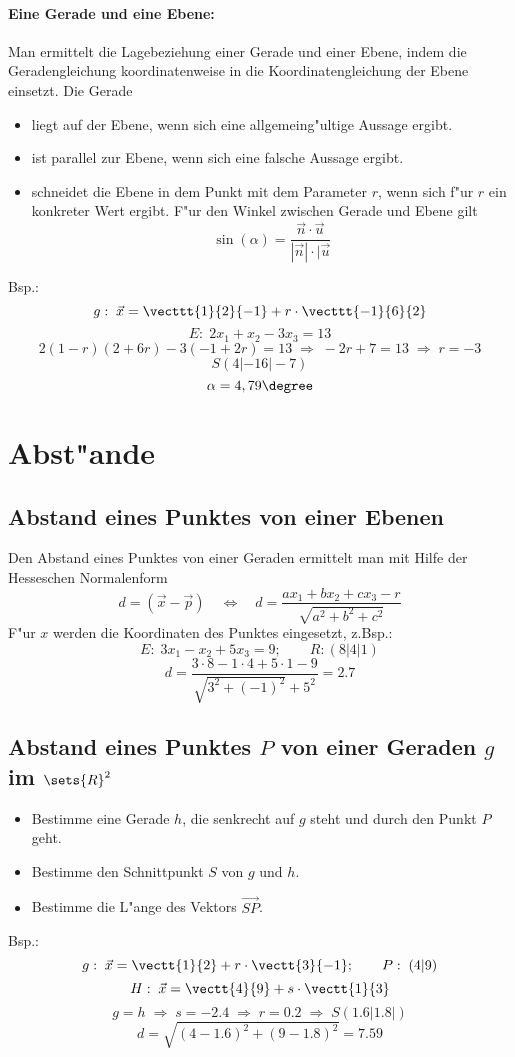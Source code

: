 \documentclass[a4paper]{article}
\begin{document}
\paragraph{Eine Gerade und eine Ebene:}
Man ermittelt die Lagebeziehung einer Gerade und einer Ebene, indem die Geradengleichung koordinatenweise in die Koordinatengleichung der Ebene einsetzt. Die Gerade
\begin{itemize}
\item liegt auf der Ebene, wenn sich eine allgemeing"ultige Aussage ergibt.
\item ist parallel zur Ebene, wenn sich eine falsche Aussage ergibt.
\item schneidet die Ebene in dem Punkt mit dem Parameter $r$, wenn sich f"ur $r$ ein konkreter Wert ergibt. F"ur den Winkel zwischen Gerade und Ebene gilt $$\sin(\alpha)= \frac{\vec{n} \cdot \vec{u}}{|\vec{n}| \cdot |\vec{u}}$$
\end{itemize}
Bsp.:
$$g:\; \vec{x} = \vecttt{1}{2}{-1} + r \cdot \vecttt{-1}{6}{2}$$
$$E:\; 2x_1+x_2 -3x_3 = 13$$
$$2(1-r) (2+6r) - 3(-1+2r) = 13 \; \Rightarrow\; -2r + 7 = 13 \;\Rightarrow\; r=-3$$
$$S(4|-16|-7)$$
$$\alpha = 4,79\degree$$





\section{Abst"ande}
\subsection{Abstand eines Punktes von einer Ebenen}
Den Abstand eines Punktes von einer Geraden ermittelt man mit Hilfe der Hesseschen Normalenform
$$d = (\vec{x} - \vec{p}) \quad \Leftrightarrow \quad d = \frac{ax_1 + bx_2 + cx_3 -r}{\sqrt{a^2+b^2+c^2}}$$
F"ur $x$ werden die Koordinaten des Punktes eingesetzt, z.Bsp.:
$$E: \; 3x_1 -x_2+5x_3 = 9; \qquad R: (8 | 4| 1)$$
$$d = \frac{3 \cdot 8 - 1 \cdot 4 + 5\cdot 1 -9}{\sqrt{3^2+(-1)^2}+5^2}=2.7$$

\subsection{Abstand eines Punktes $P$ von einer Geraden $g$ im $\sets{R}^2$}
\begin{itemize}
\item Bestimme eine Gerade $h$, die senkrecht auf $g$ steht und durch den Punkt $P$ geht.
\item Bestimme den Schnittpunkt $S$ von $g$ und $h$.
\item Bestimme die L"ange des Vektors $\vec{SP}$.
\end{itemize}
Bsp.:
$$g: \; \vec{x} = \vectt{1}{2} + r \cdot \vectt{3}{-1}; \qquad P: \; (4|9)$$
$$H: \; \vec{x} = \vectt{4}{9} + s \cdot \vectt{1}{3}$$
$$g=h \;\Rightarrow\; s = -2.4\;\Rightarrow\;r=0.2\;\Rightarrow\;S(1.6|1.8|)$$
$$d=\sqrt{(4-1.6)^2+(9-1.8)^2} = 7.59$$
\end{document}
